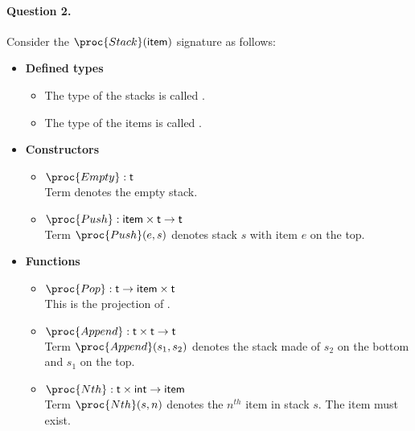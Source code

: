 \paragraph{Question 2.} Consider the
\(\proc{Stack}(\type{item})\) signature as follows:
  \begin{itemize}

    \item \textbf{Defined types}

    \begin{itemize}

      \item The type of the stacks is called .

      \item The type of the items is called .
 
    \end{itemize}

    \item \textbf{Constructors}

    \begin{itemize}
 
      \item \(\proc{Empty} : \type{t}\)\\
       Term  denotes the empty stack.

      \item \(\proc{Push} : \type{item} \times \type{t} \rightarrow
        \type{t}\)\\
      Term \(\proc{Push} (e, s)\) denotes stack \(s\) with
      item \(e\) on the top.

    \end{itemize}

    \item \textbf{Functions}

    \begin{itemize}

      \item \(\proc{Pop} : \type{t} \rightarrow \type{item} \times
        \type{t}\)\\
      This is the projection of .

      \item \(\proc{Append} : \type{t} \times \type{t} \rightarrow
        \type{t}\)\\
      Term \(\proc{Append} (s_1, s_2)\) denotes the stack
      made of \(s_2\) on the bottom and \(s_1\) on the top.

      \item \(\proc{Nth} : \type{t} \times \type{int} \rightarrow
        \type{item}\)\\
      Term \(\proc{Nth} (s, n)\) denotes the \(n^{th}\) item
      in stack \(s\). The item must exist.


\end{itemize}
\end{itemize}
